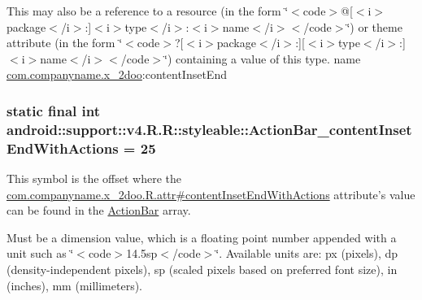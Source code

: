 This may also be a reference to a resource (in the form \char`\"{}$<$code$>$@\mbox{[}$<$i$>$package$<$/i$>$:\mbox{]}$<$i$>$type$<$/i$>$:$<$i$>$name$<$/i$>$$<$/code$>$\char`\"{}) or theme attribute (in the form \char`\"{}$<$code$>$?\mbox{[}$<$i$>$package$<$/i$>$:\mbox{]}\mbox{[}$<$i$>$type$<$/i$>$:\mbox{]}$<$i$>$name$<$/i$>$$<$/code$>$\char`\"{}) containing a value of this type.  name \hyperlink{namespacecom_1_1companyname_1_1x__2doo}{com.companyname.x\_\-2doo}:contentInsetEnd \hypertarget{classandroid_1_1support_1_1v4_1_1_r_1_1styleable_8f6d660506a9045530ddc8d45a060796}{
\subsubsection[{ActionBar\_\-contentInsetEndWithActions}]{\setlength{\rightskip}{0pt plus 5cm}static final int android::support::v4.R.R::styleable::ActionBar\_\-contentInsetEndWithActions = 25}}
\label{classandroid_1_1support_1_1v4_1_1_r_1_1styleable_8f6d660506a9045530ddc8d45a060796}


This symbol is the offset where the \hyperlink{classcom_1_1companyname_1_1x__2doo_1_1_r_1_1attr_af3871d51ee2abdd46db1ee09223225a}{com.companyname.x\_\-2doo.R.attr\#contentInsetEndWithActions} attribute's value can be found in the \hyperlink{classandroid_1_1support_1_1v4_1_1_r_1_1styleable_5c6cf2c83551ebae05f365bb913fdddf}{ActionBar} array.

Must be a dimension value, which is a floating point number appended with a unit such as \char`\"{}$<$code$>$14.5sp$<$/code$>$\char`\"{}. Available units are: px (pixels), dp (density-independent pixels), sp (scaled pixels based on preferred font size), in (inches), mm (millimeters). 

